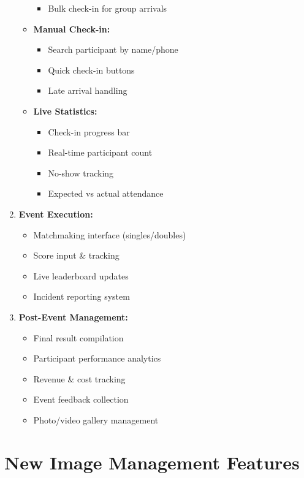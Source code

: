 \documentclass[12pt,a4paper]{article}
\begin{document}
\begin{implemented}
\begin{enumerate}
\begin{itemize}
\begin{itemize}
            \item Bulk check-in for group arrivals
        \end{itemize}
        \item \textbf{Manual Check-in:}
        \begin{itemize}
            \item Search participant by name/phone
            \item Quick check-in buttons
            \item Late arrival handling
        \end{itemize}
        \item \textbf{Live Statistics:}
        \begin{itemize}
            \item Check-in progress bar
            \item Real-time participant count
            \item No-show tracking
            \item Expected vs actual attendance
        \end{itemize}
    \end{itemize}
    \item \textbf{Event Execution:}
    \begin{itemize}
        \item Matchmaking interface (singles/doubles)
        \item Score input \& tracking
        \item Live leaderboard updates
        \item Incident reporting system
    \end{itemize}
    \item \textbf{Post-Event Management:}
    \begin{itemize}
        \item Final result compilation
        \item Participant performance analytics
        \item Revenue \& cost tracking
        \item Event feedback collection
        \item Photo/video gallery management
    \end{itemize}
\end{enumerate}
\end{implemented}

\section{New Image Management Features}
\end{document}
